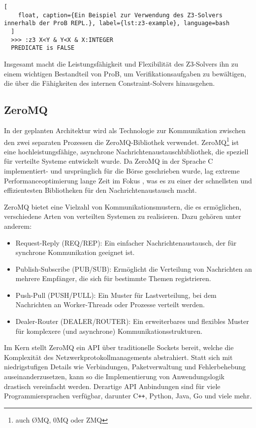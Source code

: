\begin{lstlisting}[
    float, caption={Ein Beispiel zur Verwendung des Z3-Solvers innerhalb der ProB REPL.}, label={lst:z3-example}, language=bash
  ]
  >>> :z3 X<Y & Y<X & X:INTEGER
  PREDICATE is FALSE
\end{lstlisting}
\FloatBarrier


Insgesamt macht die Leistungsfähigkeit und Flexibilität des Z3-Solvers ihn zu einem wichtigen Bestandteil von ProB,
um Verifikationsaufgaben zu bewältigen, die über die Fähigkeiten des internen Constraint-Solvers hinausgehen.


\subsection{ZeroMQ}
\label{sec:zeromq}

In der geplanten Architektur wird als Technologie zur Kommunikation zwischen den zwei separaten Prozessen die ZeroMQ-Bibliothek \cite{hintjens2013zeromq} verwendet.
ZeroMQ\footnote{auch ØMQ, 0MQ oder ZMQ} ist eine hochleistungsfähige, asynchrone Nachrichtenaustauschbibliothek, die speziell für verteilte Systeme entwickelt wurde.
Da ZeroMQ in der Sprache C implementiert- und ursprünglich für die Börse geschrieben wurde, lag extreme Performanceoptimierung lange Zeit im Fokus \cite{sustrik2015zeromq},
was es zu einer der schnellsten und effizientesten Bibliotheken für den Nachrichtenaustausch macht.

ZeroMQ bietet eine Vielzahl von Kommunikationsmustern, die es ermöglichen, verschiedene Arten von verteilten Systemen zu realisieren.
Dazu gehören unter anderem:

\begin{itemize}
    \item Request-Reply (REQ/REP): Ein einfacher Nachrichtenaustausch, der für synchrone Kommunikation geeignet ist.
    \item Publish-Subscribe (PUB/SUB): Ermöglicht die Verteilung von Nachrichten an mehrere Empfänger, die sich für bestimmte Themen registrieren.
    \item Push-Pull (PUSH/PULL): Ein Muster für Lastverteilung, bei dem Nachrichten an Worker-Threads oder Prozesse verteilt werden.
    \item Dealer-Router (DEALER/ROUTER): Ein erweiterbares und flexibles Muster für komplexere (und asynchrone) Kommunikationsstrukturen.
\end{itemize}

Im Kern stellt ZeroMQ ein API über traditionelle Sockets bereit, welche die Komplexität des Netzwerkprotokollmanagements abstrahiert.
Statt sich mit niedrigstufigen Details wie Verbindungen, Paketverwaltung und Fehlerbehebung auseinanderzusetzen, kann so die Implementierung von Anwendungslogik drastisch vereinfacht werden.
Derartige API Anbindungen sind für viele Programmiersprachen verfügbar, darunter C\texttt{++}, Python, Java, Go und viele mehr.

